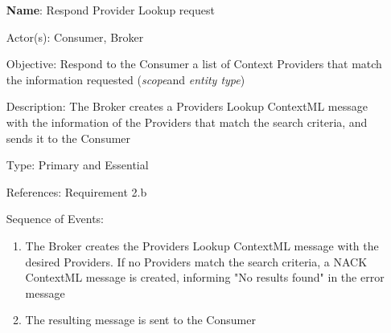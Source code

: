 \begin{itemize}
	\item[\textbf{Name}:] Respond Provider Lookup request
	\item[Actor(s):] Consumer, Broker
	\item[Objective:] Respond to the Consumer a list of Context Providers that match the information requested (\textit{scope}and \textit{entity type})
	\item[Description:] The Broker creates a Providers Lookup ContextML message with the information of the Providers that match the search criteria, and sends it to the Consumer
	\item[Type:] Primary and Essential
	\item[References:] Requirement 2.b 
	\item[Sequence of Events:]\hfill
	\begin{enumerate}
		\item The Broker creates the Providers Lookup ContextML message with the desired Providers. If no Providers match the search criteria, a NACK ContextML message is created, informing "No results found" in the error message
		\item The resulting message is sent to the Consumer
	\end{enumerate}
\end{itemize}

